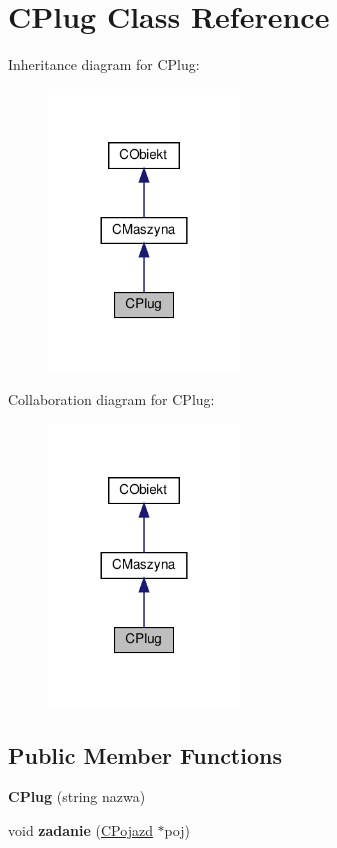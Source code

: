 \hypertarget{class_c_plug}{}\section{C\+Plug Class Reference}
\label{class_c_plug}


Inheritance diagram for C\+Plug\+:\nopagebreak
\begin{figure}[H]
\begin{center}
\leavevmode
\includegraphics[width=144pt]{class_c_plug__inherit__graph}
\end{center}
\end{figure}


Collaboration diagram for C\+Plug\+:\nopagebreak
\begin{figure}[H]
\begin{center}
\leavevmode
\includegraphics[width=144pt]{class_c_plug__coll__graph}
\end{center}
\end{figure}
\subsection*{Public Member Functions}
\begin{DoxyCompactItemize}
\item 
\mbox{\label{class_c_plug_a543e8784f908ab3c605ccd821160c152}} 
{\bfseries C\+Plug} (string nazwa)
\item 
\mbox{\label{class_c_plug_ad51882adc76b4ad6bcfbc7464903f28d}} 
void {\bfseries zadanie} (\mbox{\hyperlink{class_c_pojazd}{C\+Pojazd}} $\ast$poj)
\end{DoxyCompactItemize}
